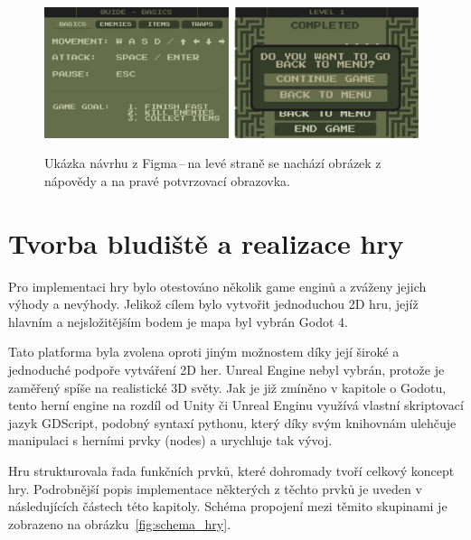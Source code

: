 \begin{figure}[H]
    \centering
    \includegraphics[width=0.48\textwidth]{obrazky-figures/ch3/Quide - Basics.png}\hspace{0.1cm}
    \includegraphics[width=0.486\textwidth]{obrazky-figures/ch3/level_completed_affirming_menu.png}
    \caption{Ukázka návrhu z Figma\,--\,na levé straně se nachází obrázek z nápovědy a na pravé potvrzovací obrazovka.}
    \label{fig:information_screen}
\end{figure}

\chapter{Tvorba bludiště a realizace hry}\label{Tvorba bludiště a realizace hry}
Pro implementaci hry bylo otestováno několik game enginů a zváženy jejich výhody a nevýhody. Jelikož cílem bylo vytvořit jednoduchou 2D hru, jejíž hlavním a nejsložitějším bodem je mapa byl vybrán Godot 4. 

Tato platforma byla zvolena oproti jiným možnostem díky její široké a jednoduché podpoře vytváření 2D her. Unreal Engine nebyl vybrán, protože je zaměřený spíše na realistické 3D světy. Jak je již zmíněno v kapitole o Godotu, tento herní engine na rozdíl od Unity či Unreal Enginu využívá vlastní skriptovací jazyk GDScript, podobný syntaxí pythonu, který díky svým knihovnám ulehčuje manipulaci s herními prvky (nodes) a urychluje tak vývoj.

Hru strukturovala řada funkčních prvků, které dohromady tvoří celkový koncept hry. Podrobnější popis implementace některých z těchto prvků je uveden v následujících částech této kapitoly. Schéma propojení mezi těmito skupinami je zobrazeno na obrázku~\ref{fig:schema_hry}.

